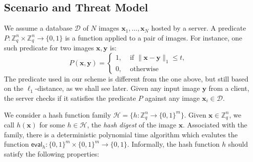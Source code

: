 \documentclass[pdflatex,sn-mathphys-num]{sn-jnl}
\theoremstyle{definition}
\newcommand{\vtr}[1]{\mathbf{#1}}
\newcommand{\norm}[1]{\lVert{#1}\rVert}
\newcommand{\database}{\mathcal{D}}
\begin{document}
\subsection{Scenario and Threat Model}
\label{subsec:require}
We assume a database $\database$ of $N$ images $\vtr{x}_1, \ldots, \vtr{x}_{N}$ hosted by a server. 
A predicate $P : \mathbb{Z}_q^n \times \mathbb{Z}_q^n \rightarrow \{0, 1\}$ is a function applied to a pair of images. For instance, one such predicate for two images $\vtr{x}, \vtr{y}$ is:
\begin{equation}
\label{eq:l1-distance-pred}
P(\vtr{x}, \vtr{y}) = \begin{cases}
    1, &\text{ if } \norm{\vtr{x} - \vtr{y}}_1 \leq t, \\
    0, & \text{ otherwise}
\end{cases}
\end{equation}
The predicate used in our scheme is different from the one above, but still based on the $\ell_1$-distance, as we shall see later.
Given any input image $\vtr{y}$ from a client, the server checks if it satisfies the predicate $P$ against any image $\vtr{x}_i \in \database$. 

We consider a hash function family $\mathcal{H} = \{ h : \mathbb{Z}_q^n \rightarrow \{0, 1\}^m \}$. Given $\vtr{x} \in \mathbb{Z}_q^n$, we call $h(\vtr{x})$ for some $h \in \mathcal{H}$, the \emph{hash digest} of the image $\vtr{x}$. Associated with the family, there is a deterministic polynomial time algorithm which evalutes the function $\mathsf{eval}_h : \{0, 1\}^m \times \{0, 1\}^m \rightarrow \{0, 1\}$. %
Informally, the hash function $h$ should satisfy the following properties:
\end{document}
